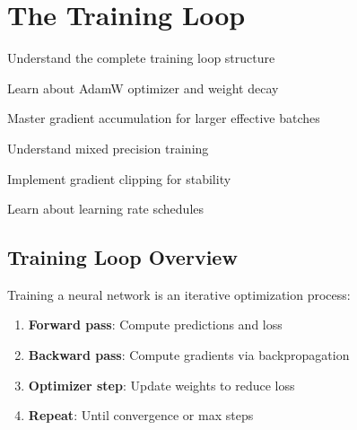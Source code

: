 \chapter{The Training Loop}
\label{ch:training-loop}

\begin{objectives}
    \item Understand the complete training loop structure
    \item Learn about AdamW optimizer and weight decay
    \item Master gradient accumulation for larger effective batches
    \item Understand mixed precision training
    \item Implement gradient clipping for stability
    \item Learn about learning rate schedules
\end{objectives}

\section{Training Loop Overview}

Training a neural network is an iterative optimization process:

\begin{enumerate}
    \item \textbf{Forward pass}: Compute predictions and loss
    \item \textbf{Backward pass}: Compute gradients via backpropagation
    \item \textbf{Optimizer step}: Update weights to reduce loss
    \item \textbf{Repeat}: Until convergence or max steps
\end{enumerate}

